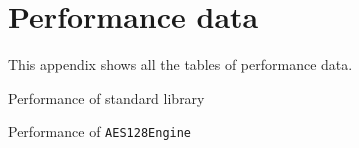 %
%
%
%

\chapter{Performance data}
\label{chap:Performance data}

This appendix shows all the tables of performance data.

\begin{table}
  \caption{Performance of standard library \protect\rng}
  \label{tab:Performance of standard library RNG}
\end{table}

\begin{table}
  \caption{Performance of \protect\texttt{AES128Engine}}
  \label{tab:Performance of AES128Engine}
\end{table}

